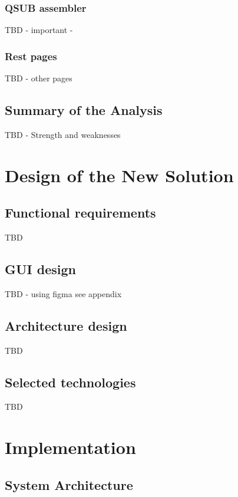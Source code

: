 \documentclass[
  digital,     %
  oneside,     %
  nosansbold,  %
  nocolorbold, %
  lof,         %
  lot,         %
]{fithesis4}
\begin{document}
\subsection{QSUB assembler}
\label{subsec:qsub-assembler}
TBD - important - 

\subsection{Rest pages}
\label{subsec:rest-pages}
TBD - other pages

\section{Summary of the Analysis}
TBD - Strength and weaknesses


\chapter{Design of the New Solution}
\label{chap:design}

\section{Functional requirements}
\label{sec:functional-requirements}
TBD

\section{GUI design}
\label{sec:gui-design}
TBD - using figma see appendix

\section{Architecture design}
\label{sec:architecture-design}
TBD

\section{Selected technologies}
\label{sec:selected-technologies}
TBD



\chapter{Implementation}
\label{chap:implementation}

\section{System Architecture}
\label{sec:system-architecture-new}
\end{document}
